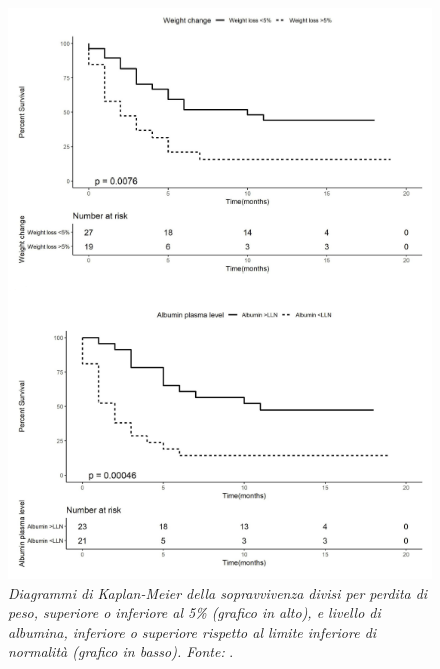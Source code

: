 \begin{figure}[htp]
\centering
\includegraphics[scale=1.1]{Immagini/magri_sopravvivenza.png}
\caption{\label{fig:magri_sopravvivenza} \textit{Diagrammi di Kaplan-Meier della sopravvivenza divisi per perdita di peso, superiore o inferiore al 5\% (grafico in alto), e livello di albumina, inferiore o superiore rispetto al limite inferiore di normalità (grafico in basso). Fonte:} \cite{Magri2019}.}
\end{figure}

